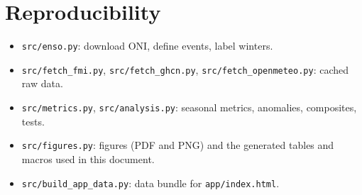 \documentclass[11pt,a4paper]{article}
\begin{document}
\section{Reproducibility}
\begin{itemize}
\item \texttt{src/enso.py}: download ONI, define events, label winters.
\item \texttt{src/fetch\_fmi.py}, \texttt{src/fetch\_ghcn.py}, \texttt{src/fetch\_openmeteo.py}: cached raw data.
\item \texttt{src/metrics.py}, \texttt{src/analysis.py}: seasonal metrics, anomalies, composites, tests.
\item \texttt{src/figures.py}: figures (PDF and PNG) and the generated tables and macros used in this document.
\item \texttt{src/build\_app\_data.py}: data bundle for \texttt{app/index.html}.
\end{itemize}

\begin{table}[H]
\caption{Stations used in the national series.}
\label{tab:sites}
\scriptsize

\end{table}

\printbibliography
\end{document}
